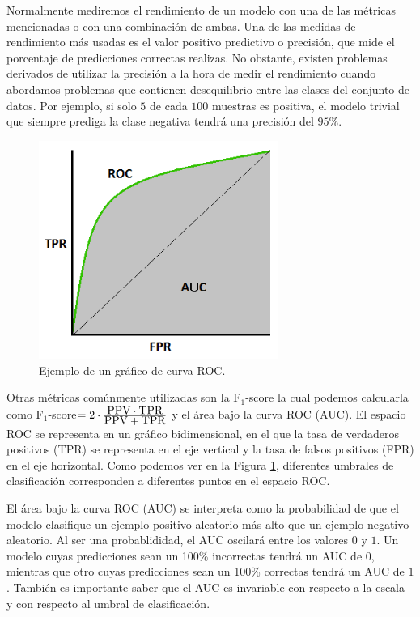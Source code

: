 \documentclass[oneside,openright,titlepage,numbers=noenddot,openany,headinclude,footinclude=true,
cleardoublepage=empty,abstractoff,BCOR=5mm,paper=a4,fontsize=12pt,main=spanish]{scrreprt}
\begin{document}
Normalmente mediremos el rendimiento de un modelo con una de las métricas mencionadas o con una combinación de ambas. Una de las medidas de rendimiento más usadas es el valor positivo predictivo o precisión, que mide el porcentaje de predicciones correctas realizas. No obstante, existen problemas derivados de utilizar la precisión a la hora de medir el rendimiento cuando abordamos problemas que contienen desequilibrio entre las clases del conjunto de datos. Por ejemplo, si solo $5$ de cada $100$ muestras es positiva, el modelo trivial que siempre prediga la clase negativa tendrá una precisión del $95\%$.

\clearpage

\begin{figure}[h]
	\centering
	\includegraphics[width=7.8cm]{ROC_curve.png}
	\caption{Ejemplo de un gráfico de curva ROC.}
    \label{fig:curvaROC}
\end{figure}

Otras métricas comúnmente utilizadas son la F$_1$-score la cual podemos calcularla como F$_1$-score$=2 \cdot \frac{\displaystyle \text{PPV}\cdot \text{TPR}}{\displaystyle \text{PPV}+\text{TPR}}$ y el área bajo la curva ROC (AUC). El espacio ROC se representa en
un gráfico bidimensional, en el que la tasa de verdaderos positivos (TPR) se representa en el eje vertical y la tasa de falsos positivos (FPR) en
el eje horizontal. Como podemos ver en la Figura \ref{fig:curvaROC}, diferentes umbrales de clasificación corresponden a diferentes puntos en el espacio ROC.  

El área bajo la curva ROC (AUC) se interpreta como la probabilidad de que el modelo clasifique un ejemplo positivo aleatorio más alto que un ejemplo negativo aleatorio. Al ser una probablididad, el AUC oscilará entre los valores $0$ y $1$. Un modelo cuyas predicciones sean un 100\% incorrectas tendrá un AUC de $0$, mientras que otro cuyas predicciones sean un 100\% correctas tendrá un AUC de $1$. También es importante saber que el AUC es invariable con respecto a la escala y con respecto al umbral de clasificación.
\end{document}
